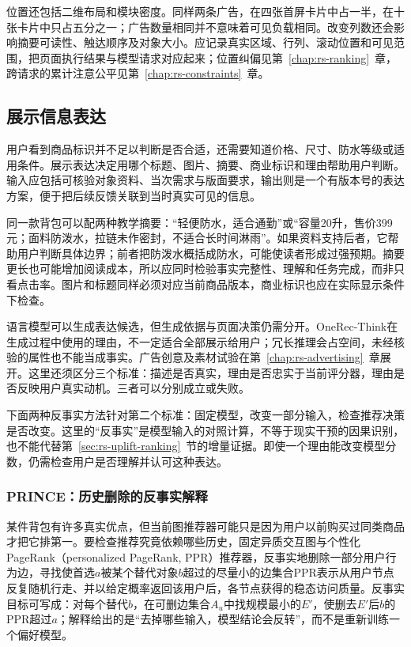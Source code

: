 位置还包括二维布局和模块密度。同样两条广告，在四张首屏卡片中占一半，在十张卡片中只占五分之一；广告数量相同并不意味着可见负载相同。改变列数还会影响摘要可读性、触达顺序及对象大小。应记录真实区域、行列、滚动位置和可见范围，把页面执行结果与模型请求对应起来；位置纠偏见第~\ref{chap:rs-ranking}~章，跨请求的累计注意公平见第~\ref{chap:rs-constraints}~章。

\subsection{展示信息表达}
\label{sec:rs-presentation-expression}

用户看到商品标识并不足以判断是否合适，还需要知道价格、尺寸、防水等级或适用条件。展示表达决定用哪个标题、图片、摘要、商业标识和理由帮助用户判断。输入应包括可核验对象资料、当次需求与版面要求，输出则是一个有版本号的表达方案，便于把后续反馈关联到当时真实可见的信息。

同一款背包可以配两种教学摘要：“轻便防水，适合通勤”或“容量20升，售价399元；面料防泼水，拉链未作密封，不适合长时间淋雨”。如果资料支持后者，它帮助用户判断具体边界；前者把防泼水概括成防水，可能使读者形成过强预期。摘要更长也可能增加阅读成本，所以应同时检验事实完整性、理解和任务完成，而非只看点击率。图片和标题同样必须对应当前商品版本，商业标识也应在实际显示条件下检查。

语言模型可以生成表达候选，但生成依据与页面决策仍需分开。OneRec-Think在生成过程中使用的理由，不一定适合全部展示给用户；冗长推理会占空间，未经核验的属性也不能当成事实。广告创意及素材试验在第~\ref{chap:rs-advertising}~章展开。这里还须区分三个标准：描述是否真实，理由是否忠实于当前评分器，理由是否反映用户真实动机。三者可以分别成立或失败。

下面两种反事实方法针对第二个标准：固定模型，改变一部分输入，检查推荐决策是否改变。这里的“反事实”是模型输入的对照计算，不等于现实干预的因果识别，也不能代替第~\ref{sec:rs-uplift-ranking}~节的增量证据。即使一个理由能改变模型分数，仍需检查用户是否理解并认可这种表达。

\subsubsection{PRINCE：历史删除的反事实解释}
\label{sec:rs-prince}

某件背包有许多真实优点，但当前图推荐器可能只是因为用户以前购买过同类商品才把它排第一。要检查推荐究竟依赖哪些历史，固定异质交互图与个性化PageRank（personalized PageRank, PPR）推荐器，反事实地删除一部分用户行为边，寻找使首选$a$被某个替代对象$b$超过的尽量小的边集合PPR表示从用户节点反复随机行走、并以给定概率返回该用户后，各节点获得的稳态访问质量。反事实目标可写成：对每个替代$b$，在可删边集合$A_u$中找规模最小的$E'$，使删去$E'$后$b$的PPR超过$a$；解释给出的是“去掉哪些输入，模型结论会反转”，而不是重新训练一个偏好模型。

